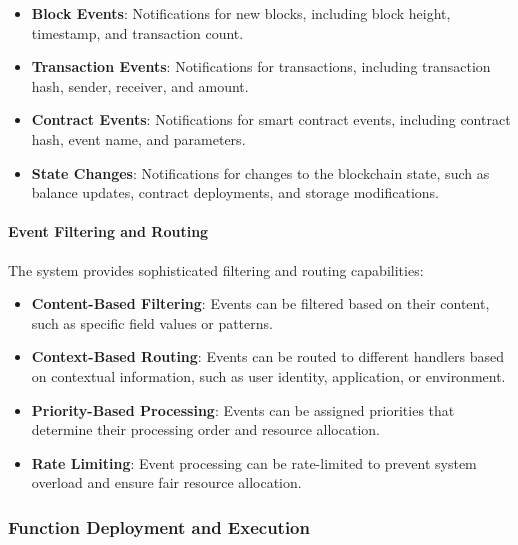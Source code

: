 \begin{itemize}
    \item \textbf{Block Events}: Notifications for new blocks, including block height, timestamp, and transaction count.
    
    \item \textbf{Transaction Events}: Notifications for transactions, including transaction hash, sender, receiver, and amount.
    
    \item \textbf{Contract Events}: Notifications for smart contract events, including contract hash, event name, and parameters.
    
    \item \textbf{State Changes}: Notifications for changes to the blockchain state, such as balance updates, contract deployments, and storage modifications.
\end{itemize}

\paragraph{Event Filtering and Routing}
The system provides sophisticated filtering and routing capabilities:

\begin{itemize}
    \item \textbf{Content-Based Filtering}: Events can be filtered based on their content, such as specific field values or patterns.
    
    \item \textbf{Context-Based Routing}: Events can be routed to different handlers based on contextual information, such as user identity, application, or environment.
    
    \item \textbf{Priority-Based Processing}: Events can be assigned priorities that determine their processing order and resource allocation.
    
    \item \textbf{Rate Limiting}: Event processing can be rate-limited to prevent system overload and ensure fair resource allocation.
\end{itemize}

\subsubsection{Function Deployment and Execution}
\label{subsubsec:function-deployment}

